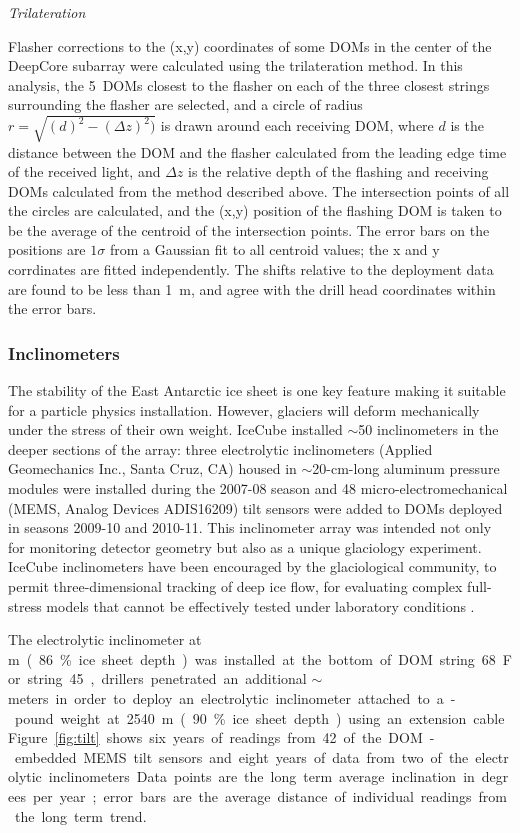 {\it Trilateration}

Flasher corrections to the (x,y) coordinates of some DOMs in the
center of the DeepCore subarray were calculated using the
trilateration method. In this analysis, the 5~DOMs closest to the
flasher on each of the three closest strings surrounding the flasher are selected,
and a circle of radius $r = \sqrt{(d)^2 - (\Delta z)^2)}$ is drawn
around each receiving DOM, where $d$ is the distance between the DOM and the flasher calculated from the leading edge time of the received
light, and  $\Delta z$ is the relative depth of the flashing and
receiving DOMs calculated from the method described above. The
intersection points of all the circles are calculated, and the (x,y)
position of the flashing DOM is taken to be the average of the
centroid of the intersection points. The error bars on the positions
are $1 \sigma$ from a Gaussian fit to all centroid values; the x and y
corrdinates are fitted independently. The shifts relative to the
deployment data are found to be less than 1~m, and agree with the
drill head coordinates within the error bars.

\subsubsection{Inclinometers}

The stability of the East Antarctic ice sheet is one key feature making it suitable for a particle physics installation.  However, glaciers will deform mechanically under the stress of their own weight.  IceCube installed $\sim$50 inclinometers in the deeper sections of the array:  three electrolytic inclinometers (Applied Geomechanics Inc., Santa Cruz, CA) housed in $\sim$20-cm-long aluminum pressure modules were installed during the 2007-08 season and 48 micro-electromechanical (MEMS, Analog Devices ADIS16209) tilt sensors were added to DOMs deployed in seasons 2009-10 and 2010-11.  This inclinometer array was intended not only for monitoring detector geometry but also as a unique glaciology experiment.  IceCube inclinometers have been encouraged by the glaciological community, to permit three-dimensional tracking of deep ice flow, for evaluating complex full-stress models that cannot be effectively tested under laboratory conditions \cite{pattyn03}.

The electrolytic inclinometer at \unit[2455]m (86\% ice sheet depth) was installed at the bottom of DOM string 68.  For string 45, drillers penetrated an additional $\sim$\unit[100]meters in order to deploy an electrolytic inclinometer attached to a \unit[100]-pound weight at 2540 m (90\% ice sheet depth) using an extension cable.  Figure \ref{fig:tilt} shows six years of readings from 42 of the DOM-embedded MEMS tilt sensors and eight years of data from two of the electrolytic inclinometers.  Data points are the long term average inclination in degrees per year; error bars are the average distance of individual readings from the long term trend.


